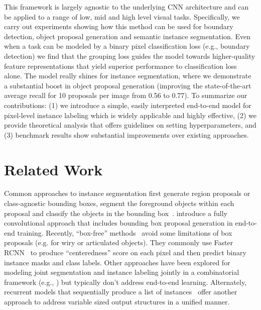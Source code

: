 This framework is largely agnostic to the underlying CNN architecture and can
be applied to a range of low, mid and high level visual tasks. Specifically,
we carry out experiments showing how this method can be used for boundary
detection, object proposal generation and semantic instance segmentation. Even
when a task can be modeled by a binary pixel classification loss (e.g.,
boundary detection) we find that the grouping loss guides the model towards
higher-quality feature representations that yield superior performance to
classification loss alone. The model really shines for instance segmentation,
where we demonstrate a substantial boost in object proposal generation
(improving the state-of-the-art average recall for 10 proposals per image from
0.56 to 0.77).  To summarize our contributions: (1) we introduce a simple,
easily interpreted end-to-end model for pixel-level instance labeling which is
widely applicable and highly effective, (2) we provide theoretical analysis
that offers guidelines on setting hyperparameters, and (3) benchmark results
show substantial improvements over existing approaches.


\section{Related Work}

Common approaches to instance segmentation first generate region proposals or
class-agnostic bounding boxes, segment the foreground objects within each
proposal and classify the objects in the bounding box~\cite{yang2012layered,
ladicky2010and, hariharan2014simultaneous, chen2015multi, dai2016instance,
liang2016reversible, he2017mask}.  \cite{li2016fully} introduce a fully
convolutional approach that includes bounding box proposal generation in
end-to-end training.  Recently, ``box-free''
methods~\cite{pinheiro2015learning, pinheiro2016learning, liang2015proposal,
hu2016fastmask} avoid some limitations of box proposals (e.g. for wiry or
articulated objects). They commonly use Faster RCNN~\cite{ren2015faster} to
produce ``centeredness'' score on each pixel and then predict binary instance
masks and class labels.  Other approaches have been explored for modeling joint
segmentation and instance labeling jointly in a combinatorial framework (e.g.,
\cite{kirillov2016instancecut}) but typically don't address end-to-end
learning.  Alternately, recurrent models that sequentially produce a list of
instances~\cite{romera2016recurrent,renend} offer another approach to address
variable sized output structures in a unified manner.

